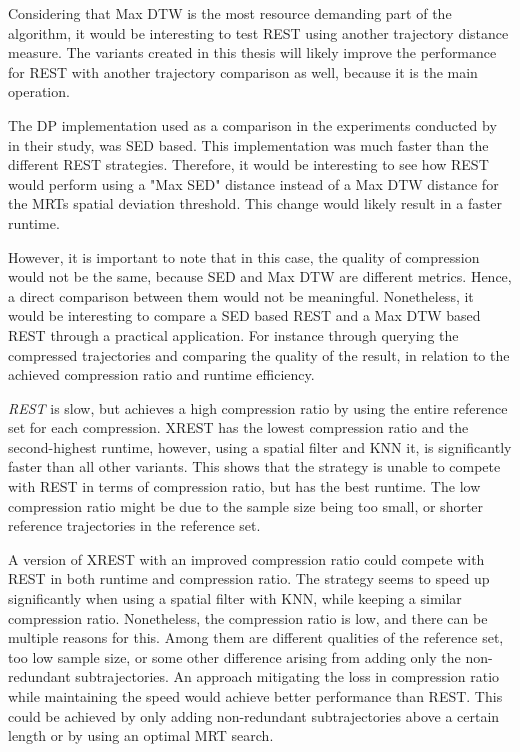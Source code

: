 Considering that Max DTW is the most resource demanding part of the algorithm, it would be interesting to test REST using another trajectory distance measure. The variants created in this thesis will likely improve the performance for REST with another trajectory comparison as well, because it is the main operation.

The DP implementation used as a comparison in the experiments conducted by \textcite{zhao2018rest} in their study, was SED based. This implementation was much faster than the different REST strategies. Therefore, it would be interesting to see how REST would perform using a "Max SED" distance instead of a Max DTW distance for the MRTs spatial deviation threshold. This change would likely result in a faster runtime.

However, it is important to note that in this case, the quality of compression would not be the same, because SED and Max DTW are different metrics. Hence, a direct comparison between them would not be meaningful. Nonetheless, it would be interesting to compare a SED based REST and a Max DTW based REST through a practical application. For instance through querying the compressed trajectories and comparing the quality of the result, in relation to the achieved compression ratio and runtime efficiency.

\textit{REST} is slow, but achieves a high compression ratio by using the entire reference set for each compression. XREST has the lowest compression ratio and the second-highest runtime, however, using a spatial filter and KNN it, is significantly faster than all other variants. This shows that the strategy is unable to compete with REST in terms of compression ratio, but has the best runtime. The low compression ratio might be due to the sample size being too small, or shorter reference trajectories in the reference set.

A version of XREST with an improved compression ratio could compete with REST in both runtime and compression ratio. The strategy seems to speed up significantly when using a spatial filter with KNN, while keeping a similar compression ratio. Nonetheless, the compression ratio is low, and there can be multiple reasons for this. Among them are different qualities of the reference set, too low sample size, or some other difference arising from adding only the non-redundant subtrajectories. An approach mitigating the loss in compression ratio while maintaining the speed would achieve better performance than REST. This could be achieved by only adding non-redundant subtrajectories above a certain length or by using an optimal MRT search.

